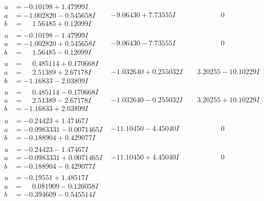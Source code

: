 \documentclass[1p]{elsarticle_modified}
\theoremstyle{definition}
\begin{document}
$$\begin{array}{c|c|c}
 \hline 
\begin{aligned}
u &= -0.10198 + 1.47999 I \\
a &= -1.002820 - 0.545658 I \\
b &= \phantom{-}1.56485 + 0.12099 I\end{aligned}
 & -9.06430 + 7.73555 I & \phantom{-0.000000 } 0 \\ \hline\begin{aligned}
u &= -0.10198 - 1.47999 I \\
a &= -1.002820 + 0.545658 I \\
b &= \phantom{-}1.56485 - 0.12099 I\end{aligned}
 & -9.06430 - 7.73555 I & \phantom{-0.000000 } 0 \\ \hline\begin{aligned}
u &= \phantom{-}0.485114 + 0.170668 I \\
a &= \phantom{-}2.51389 + 2.67178 I \\
b &= -1.16833 - 2.03899 I\end{aligned}
 & -1.032640 + 0.255032 I & \phantom{-}3.20255 - 10.10229 I \\ \hline\begin{aligned}
u &= \phantom{-}0.485114 - 0.170668 I \\
a &= \phantom{-}2.51389 - 2.67178 I \\
b &= -1.16833 + 2.03899 I\end{aligned}
 & -1.032640 - 0.255032 I & \phantom{-}3.20255 + 10.10229 I \\ \hline\begin{aligned}
u &= -0.24423 + 1.47467 I \\
a &= -0.0983331 - 0.0071465 I \\
b &= -0.188904 + 0.429077 I\end{aligned}
 & -11.10450 - 4.45040 I & \phantom{-0.000000 } 0 \\ \hline\begin{aligned}
u &= -0.24423 - 1.47467 I \\
a &= -0.0983331 + 0.0071465 I \\
b &= -0.188904 - 0.429077 I\end{aligned}
 & -11.10450 + 4.45040 I & \phantom{-0.000000 } 0 \\ \hline\begin{aligned}
u &= -0.19551 + 1.48517 I \\
a &= \phantom{-}0.081909 - 0.126058 I \\
b &= -0.394609 - 0.545514 I\end{aligned}

\end{array}$$
\end{document}
